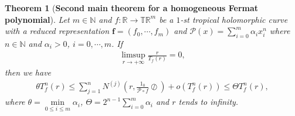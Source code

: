 \documentclass{article}
\newtheorem{theorem}[defin]{Theorem}
\begin{document}
\begin{theorem}[\textbf{Second main theorem for a homogeneous Fermat polynomial}]\label{theorem5.8}
    Let $m\in\mathbb{N}$ and $f:\mathbb{R}\rightarrow \mathbb{T}\mathbb{R}^{m}$ be a $1$-st tropical holomorphic curve with a reduced representation $\textbf{f}=(f_{0}, \cdots, f_{m})$ and $\mathcal{P}(x)=\sum_{i=0}^{m}\alpha_{i}x_{i}^{n}$ where $n\in\mathbb{N}$ and $\alpha_{i}>0$, $i=0, \cdots, m$. If
    \begin{eqnarray}\label{5f1}
        \limsup\limits_{r\rightarrow +\infty}\frac{r}{T_{f}(r)}=0,
    \end{eqnarray}
    then we have
    \begin{eqnarray}\label{5f2}
        \theta T_{f}^{n}(r)\leq \sum_{j=1}^{n}N^{(j)}\left(r, \frac{1_{0}}{\mathcal{P}\circ f}\oslash\right)+o(T_{f}^{n}(r))\leq \Theta T_{f}^{n}(r),
    \end{eqnarray}
    where $\theta=\min\limits_{0\leq i\leq m}\alpha_{i}$, $\Theta=2^{n-1}\sum_{i=0}^{m}\alpha_{i}$ and $r$ tends to infinity.
\end{theorem}
\end{document}
